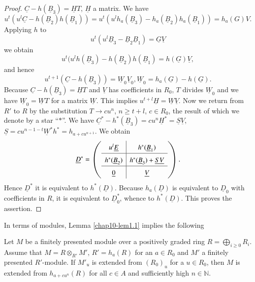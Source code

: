\begin{proof}
$\underline{C}-h(\underline{B}_{3})=\underline{H}T$, $\underline{H}$ a
matrix. We have 
$$
u^{t}(u^{l}\underline{C}-h(\underline{B}_{2})h(\underline{B}_{1}))=u^{t}(u^{l}h_{a}(\underline{B}_{3})-h_{a}(\underline{B}_{2})h_{a}(\underline{B}_{1}))=h_{a}(G)V. 
$$
Applying $h$ to
$$
u^{t}(u^{l}\underline{B}_{3}-\underline{B}_{2}\underline{B}_{1})=\underline{G}\underline{V}
$$
we obtain  
$$
u^{t}(u^{l}h(\underline{B}_{3})-h(\underline{B}_{2})h(\underline{B}_{1})=h(\underline{G})\underline{V},
$$\pageoriginale
and hence
$$
u^{t+1}(\underline{C}-h(\underline{B}_{3}))=\underline{W}_{0}\underline{V}_{0},\underline{W}_{0}=h_{a}(\underline{G})-h(\underline{G}).
$$ 
Because $\underline{C}-h(\underline{B}_{3})=\underline{H}T$ and
$\underline{V}$ has coefficients in $R_{0}$, $T$ divides
$\underline{W}_{0}$ and we have $\underline{W}_{0}=\underline{W}T$ for
a matrix $\underline{W}$. This implies
$u^{t+l}\underline{H}=\underline{W}\underline{V}$. Now we return from
$R'$ to $R$ by the substitution $T\to cu^{n}$, $n\geq t+l$, $c\in
R_{0}$, the result of which we denote by a star ``$\ast$''. We have
$\underline{C}^{*}-h^{*}(\underline{B}_{3})=cu^{n}\underline{H}^{*}=\underline{S}\underline{V}$,
$\underline{S}=cu^{n-1-t}\underline{W}^{*}h^{*}=h_{a+cu^{n+1}}$. We
obtain 
$$
\underline{D}^{*}=
\renewcommand{\arraystretch}{1.5}
\left(
\begin{array}{c|c}
u^{l}\underline{E} & h^{*}(\underline{B}_{1})\\
\hline
h^{*}(\underline{B}_{2}) &
h^{*}(\underline{B}_{3})+\underline{S}\underline{V}\\
\hline
\underline{0} & \underline{V} 
\end{array}
\right).
$$
Hence $\underline{D}^{*}$ it is equivalent to
$h^{*}(\underline{D})$. Because $h_{a}(\underline{D})$ is equivalent
to $\underline{D}_{0}$ with coefficients in $R$, it is equivalent to
$\underline{D}^{*}_{0}$, whence to $h^{*}(\underline{D})$. This proves
the assertion.
\end{proof}

In terms of modules, Lemma \ref{chap10-lem1.1} implies the following

\begin{subthm}\label{chap10-thm1.2}
Let $M$ be a finitely presented module over a positively graded ring
$R=\bigoplus\limits_{i\geq 0}R_{i}$. Assume that $M=R\otimes_{R'}M'$,
$R'=h_{a}(R)$ for an $a\in R_{0}$ and $M'$ a finitely presented
$R'$-module. If $M'_{u}$ is extended from $(R_{0})_{u}$ for a $u\in
R_{0}$, then $M$ is extended from $h_{a+cu^{n}}(R)$ for all $c\in A$
and sufficiently high $n\in \mathbb{N}$. 
\end{subthm}

